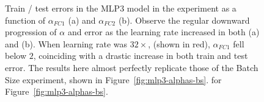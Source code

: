 \begin{figure}[t]
    \centering

    \caption{
            Train / test errors in the MLP3 model in the {\bf \emph{\LearningRate}} experiment as a function of $\alpha_{FC1}$ (a) and $\alpha_{FC2}$ (b). 
            Observe the regular downward progression of $\alpha$ and error as the learning 
            rate increased in both (a) and (b). When learning rate was $32\times$, (shown in red), $\alpha_{FC1}$ fell 
            below $2$, coinciding with a drastic increase in both train and test error. The results here almost 
            perfectly replicate those of the Batch Size experiment, shown in Figure~\ref{fig:mlp3-alphas-bs}.
              for Figure~\ref{fig:mlp3-alphas-bs}.}
 \label{fig:mlp3-alphas-lr}
\end{figure}

